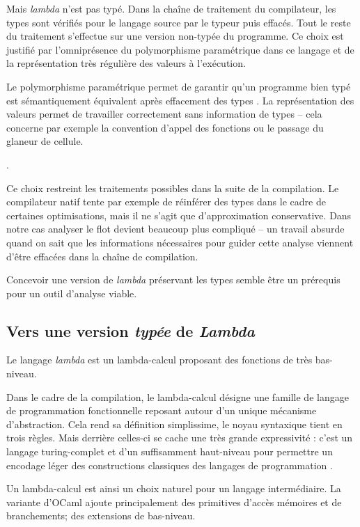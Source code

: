 Mais \emph{lambda} n'est pas typé. Dans la chaîne de traitement du
compilateur, les types sont vérifiés pour le langage source par le typeur puis
effacés. Tout le reste du traitement s'effectue sur une version non-typée du
programme. Ce choix est justifié par l'omniprésence du polymorphisme
paramétrique dans ce langage et de la représentation très régulière des valeurs
à l'exécution.

Le polymorphisme paramétrique permet de garantir qu'un programme bien typé est
sémantiquement équivalent après effacement des types .
La représentation des valeurs permet de travailler correctement sans
information de types -- cela concerne par exemple la convention d'appel des
fonctions ou le passage du glaneur de cellule.

.

Ce choix restreint les traitements possibles dans la suite de la compilation.
Le compilateur natif tente par exemple de réinférer des types dans le cadre de
certaines optimisations, mais il ne s'agit que d'approximation conservative.
Dans notre cas analyser le flot devient beaucoup plus compliqué -- un travail
absurde quand on sait que les informations nécessaires pour guider cette
analyse viennent d'être effacées dans la chaîne de compilation.

Concevoir une version de \emph{lambda} préservant les types semble être un
prérequis pour un outil d'analyse viable.

\subsection{Vers une version \emph{typée} de \emph{Lambda}}

Le langage \emph{lambda} est un lambda-calcul proposant des fonctions de très
bas-niveau.

Dans le cadre de la compilation, le lambda-calcul désigne une famille de
langage de programmation fonctionnelle reposant autour d'un unique mécanisme
d'abstraction.  Cela rend sa définition simplissime, le noyau syntaxique tient
en trois règles.  Mais derrière celles-ci se cache une très grande expressivité
: c'est un langage turing-complet et d'un suffisamment haut-niveau pour
permettre un encodage léger des constructions classiques des langages de
programmation \cite{LTU}.

Un lambda-calcul est ainsi un choix naturel pour un langage intermédiaire. La
variante d'OCaml ajoute principalement des primitives d'accès mémoires et de
branchements; des extensions de bas-niveau.

